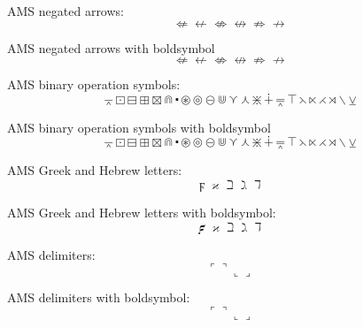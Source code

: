 \documentclass[12pt,a4paper]{article}
\theoremstyle{clearprint}
\begin{document}
\noindent
AMS negated arrows: %
\begin{equation}
\nLeftarrow \nleftarrow \nLeftrightarrow \nleftrightarrow \nRightarrow \nrightarrow
\end{equation}

\noindent
AMS negated arrows with boldsymbol
\begin{equation}
\boldsymbol{\nLeftarrow \nleftarrow \nLeftrightarrow \nleftrightarrow \nRightarrow \nrightarrow}
\end{equation}

\noindent
AMS binary operation symbols: %
\begin{equation}
\barwedge \boxdot \boxminus \boxplus \boxtimes \Cap \centerdot \circledast \circledcirc \circleddash \Cup \curlyvee \curlywedge \divideontimes \dotplus \doublebarwedge \intercal \leftthreetimes \ltimes \rightthreetimes \rtimes \smallsetminus \veebar 
\end{equation}

\noindent
AMS binary operation symbols with boldsymbol
\begin{equation}
\boldsymbol{\barwedge \boxdot \boxminus \boxplus \boxtimes \Cap \centerdot \circledast \circledcirc \circleddash \Cup \curlyvee \curlywedge \divideontimes \dotplus \doublebarwedge \intercal \leftthreetimes \ltimes \rightthreetimes \rtimes \smallsetminus \veebar}
\end{equation}

\noindent
AMS Greek and Hebrew letters: %
\begin{equation}
\digamma \varkappa \beth \gimel \daleth 
\end{equation}

\noindent
AMS Greek and Hebrew letters with boldsymbol:
\begin{equation}
\boldsymbol{\digamma \varkappa \beth \gimel \daleth} 
\end{equation}

\noindent
AMS delimiters: %
\begin{equation}
\ulcorner \urcorner \llcorner \lrcorner
\end{equation}

\noindent
AMS delimiters with boldsymbol:
\begin{equation}
\boldsymbol{\ulcorner \urcorner \llcorner \lrcorner}
\end{equation}
\end{document}
